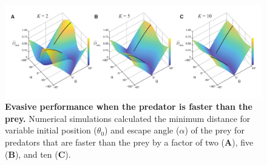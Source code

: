 \documentclass[12pt]{article}
\begin{document}
\pagebreak
\begin{figure}[t] 
\begin{centering}
\includegraphics[width=1.1\textwidth]{Fig_04.pdf}
\centering	
\caption{
\textbf{Evasive performance when the predator is faster than the
prey.} 
Numerical simulations calculated the minimum distance for variable
initial position ($\theta_0$) and escape angle ($\alpha$) of the prey for
predators that are faster than the prey by a factor of two (\textbf{A}),
five (\textbf{B}), and ten (\textbf{C}).
}
\label{k>1_topo}
\end{centering}
\end{figure}





\end{document}
